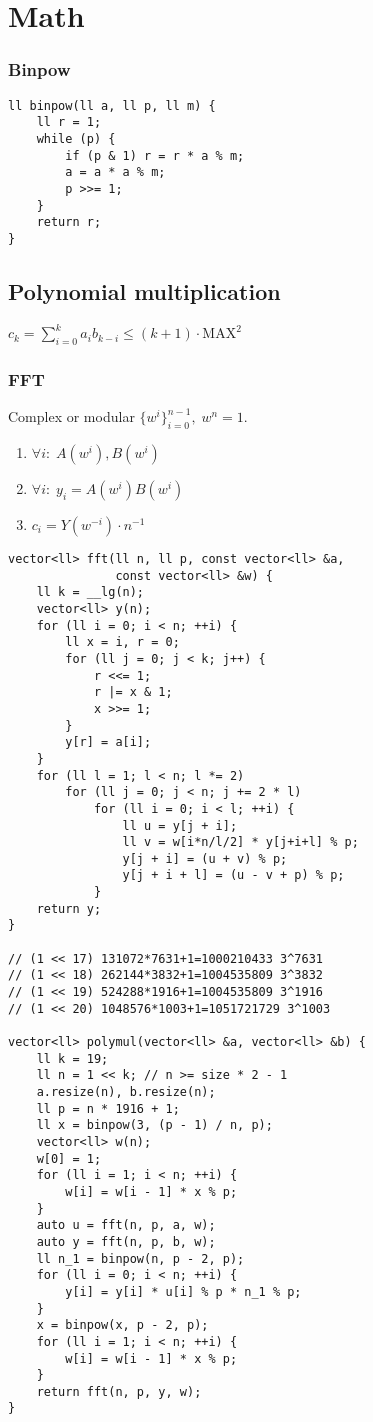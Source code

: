 \section{Math}

\subsubsection{Binpow}
\begin{verbatim}
ll binpow(ll a, ll p, ll m) {
    ll r = 1;
    while (p) {
        if (p & 1) r = r * a % m;
        a = a * a % m;
        p >>= 1;
    }
    return r;
}
\end{verbatim}

\subsection{Polynomial multiplication}

$c_k=\displaystyle\sum_{i=0}^ka_ib_{k-i}\le(k+1)\cdot\text{MAX}^2$
\subsubsection{FFT}
Complex or modular $\{w^i\}_{i=0}^{n-1},\;w^n=1$.
\begin{enumerate}
\item $\forall i:\;A(w^i),B(w^i)$
\item $\forall i:\;y_i=A(w^i)B(w^i)$
\item $c_i=Y(w^{-i})\cdot n^{-1}$
\end{enumerate}

\begin{verbatim}
vector<ll> fft(ll n, ll p, const vector<ll> &a,
               const vector<ll> &w) {
    ll k = __lg(n);
    vector<ll> y(n);
    for (ll i = 0; i < n; ++i) {
        ll x = i, r = 0;
        for (ll j = 0; j < k; j++) {
            r <<= 1;
            r |= x & 1;
            x >>= 1;
        }
        y[r] = a[i];
    }
    for (ll l = 1; l < n; l *= 2)
        for (ll j = 0; j < n; j += 2 * l)
            for (ll i = 0; i < l; ++i) {
                ll u = y[j + i];
                ll v = w[i*n/l/2] * y[j+i+l] % p;
                y[j + i] = (u + v) % p;
                y[j + i + l] = (u - v + p) % p;
            }
    return y;
}

// (1 << 17) 131072*7631+1=1000210433 3^7631
// (1 << 18) 262144*3832+1=1004535809 3^3832
// (1 << 19) 524288*1916+1=1004535809 3^1916
// (1 << 20) 1048576*1003+1=1051721729 3^1003

vector<ll> polymul(vector<ll> &a, vector<ll> &b) {
    ll k = 19;
    ll n = 1 << k; // n >= size * 2 - 1
    a.resize(n), b.resize(n);
    ll p = n * 1916 + 1;
    ll x = binpow(3, (p - 1) / n, p);
    vector<ll> w(n);
    w[0] = 1;
    for (ll i = 1; i < n; ++i) {
        w[i] = w[i - 1] * x % p;
    }
    auto u = fft(n, p, a, w);
    auto y = fft(n, p, b, w);
    ll n_1 = binpow(n, p - 2, p);
    for (ll i = 0; i < n; ++i) {
        y[i] = y[i] * u[i] % p * n_1 % p;
    }
    x = binpow(x, p - 2, p);
    for (ll i = 1; i < n; ++i) {
        w[i] = w[i - 1] * x % p;
    }
    return fft(n, p, y, w);
}

\end{verbatim}